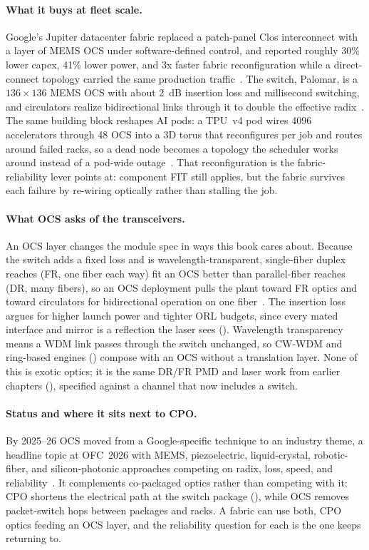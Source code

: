 \paragraph{What it buys at fleet scale.}
Google's Jupiter datacenter fabric replaced a patch-panel Clos interconnect with a layer
of MEMS OCS under software-defined control, and reported roughly 30\% lower capex, 41\%
lower power, and 3x faster fabric reconfiguration while a direct-connect topology carried
the same production traffic~. The switch, Palomar, is a
$136\times136$ MEMS OCS with about 2~dB insertion loss and millisecond switching, and
circulators realize bidirectional links through it to double the effective
radix~. The same building block reshapes AI pods: a TPU~v4 pod
wires 4096 accelerators through 48 OCS into a 3D torus that reconfigures per job and
routes around failed racks, so a dead node becomes a topology the scheduler works around
instead of a pod-wide outage~. That reconfiguration is the
fabric-reliability lever  points at: component FIT still applies,
but the fabric survives each failure by re-wiring optically rather than stalling the job.

\paragraph{What OCS asks of the transceivers.}
An OCS layer changes the module spec in ways this book cares about. Because the switch
adds a fixed loss and is wavelength-transparent, single-fiber duplex reaches (FR, one
fiber each way) fit an OCS better than parallel-fiber reaches (DR, many fibers), so an
OCS deployment pulls the plant toward FR optics and toward circulators for bidirectional
operation on one fiber~. The insertion loss argues for higher launch
power and tighter ORL budgets, since every mated interface and mirror is a reflection the
laser sees (). Wavelength transparency means a
WDM link passes through the switch unchanged, so CW-WDM and ring-based engines
() compose with an OCS without a translation layer. None of this
is exotic optics; it is the same DR/FR PMD and laser work from earlier chapters
(), specified against a channel that now includes a switch.

\paragraph{Status and where it sits next to CPO.}
By 2025--26 OCS moved from a Google-specific technique to an industry theme, a headline
topic at OFC~2026 with MEMS, piezoelectric, liquid-crystal, robotic-fiber, and
silicon-photonic approaches competing on radix, loss, speed, and
reliability~. It complements co-packaged optics rather than
competing with it: CPO shortens the electrical path at the switch package
(), while OCS removes packet-switch hops between packages and racks.
A fabric can use both, CPO optics feeding an OCS layer, and the reliability question for
each is the one  keeps returning to.

